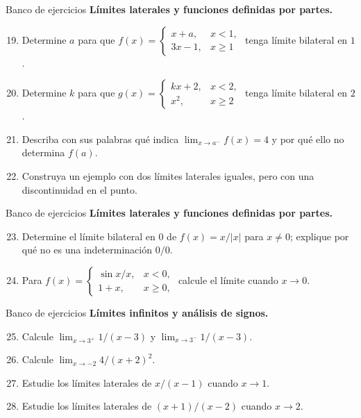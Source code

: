 \documentclass[12pt,aspectratio=169]{beamer}
\begin{document}
\begin{frame}[t,allowframebreaks]{Banco de ejercicios}
\small
\noindent \textbf{Límites laterales y funciones definidas por partes.}\par\smallskip
\begin{enumerate}\setcounter{enumi}{18}
\item Determine $a$ para que $f(x)=\begin{cases}x+a,&x<1,\\3x-1,&x\ge1\end{cases}$ tenga límite bilateral en $1$.
\item Determine $k$ para que $g(x)=\begin{cases}kx+2,&x<2,\\x^2,&x\ge2\end{cases}$ tenga límite bilateral en $2$.
\item Describa con sus palabras qué indica $\lim_{x\to a^-}f(x)=4$ y por qué ello no determina $f(a)$.
\item Construya un ejemplo con dos límites laterales iguales, pero con una discontinuidad en el punto.
\end{enumerate}
\end{frame}


\begin{frame}[t,allowframebreaks]{Banco de ejercicios}
\small
\noindent \textbf{Límites laterales y funciones definidas por partes.}\par\smallskip
\begin{enumerate}\setcounter{enumi}{22}
\item Determine el límite bilateral en $0$ de $f(x)=x/|x|$ para $x\ne0$; explique por qué no es una indeterminación $0/0$.
\item Para $f(x)=\begin{cases}\sin x/x,&x<0,\\1+x,&x\ge0,\end{cases}$ calcule el límite cuando $x\to0$.
\end{enumerate}
\end{frame}


\begin{frame}[t,allowframebreaks]{Banco de ejercicios}
\small
\noindent \textbf{Límites infinitos y análisis de signos.}\par\smallskip
\begin{enumerate}\setcounter{enumi}{24}
\item Calcule $\lim_{x\to3^+}1/(x-3)$ y $\lim_{x\to3^-}1/(x-3)$.
\item Calcule $\lim_{x\to-2}4/(x+2)^2$.
\item Estudie los límites laterales de $x/(x-1)$ cuando $x\to1$.
\item Estudie los límites laterales de $(x+1)/(x-2)$ cuando $x\to2$.
\end{enumerate}
\end{frame}
\end{document}
